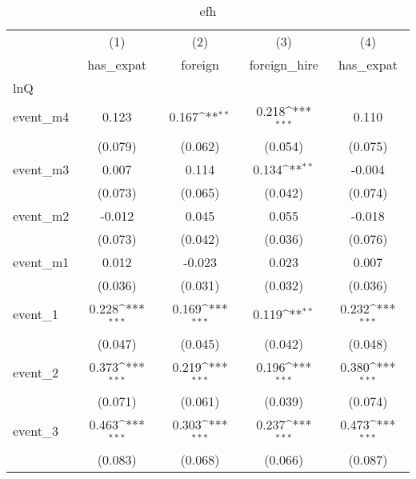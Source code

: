 \begin{table}[htbp]\centering
\def\sym#1{\ifmmode^{#1}\else\(^{#1}\)\fi}
\caption{efh}
\begin{tabular}{l*{4}{c}}
\hline\hline
            &\multicolumn{1}{c}{(1)}&\multicolumn{1}{c}{(2)}&\multicolumn{1}{c}{(3)}&\multicolumn{1}{c}{(4)}\\
            &\multicolumn{1}{c}{has\_expat}&\multicolumn{1}{c}{foreign}&\multicolumn{1}{c}{foreign\_hire}&\multicolumn{1}{c}{has\_expat}\\
\hline
lnQ         &                     &                     &                     &                     \\
event\_m4    &       0.123         &       0.167\sym{**} &       0.218\sym{***}&       0.110         \\
            &     (0.079)         &     (0.062)         &     (0.054)         &     (0.075)         \\
[1em]
event\_m3    &       0.007         &       0.114         &       0.134\sym{**} &      -0.004         \\
            &     (0.073)         &     (0.065)         &     (0.042)         &     (0.074)         \\
[1em]
event\_m2    &      -0.012         &       0.045         &       0.055         &      -0.018         \\
            &     (0.073)         &     (0.042)         &     (0.036)         &     (0.076)         \\
[1em]
event\_m1    &       0.012         &      -0.023         &       0.023         &       0.007         \\
            &     (0.036)         &     (0.031)         &     (0.032)         &     (0.036)         \\
[1em]
event\_1     &       0.228\sym{***}&       0.169\sym{***}&       0.119\sym{**} &       0.232\sym{***}\\
            &     (0.047)         &     (0.045)         &     (0.042)         &     (0.048)         \\
[1em]
event\_2     &       0.373\sym{***}&       0.219\sym{***}&       0.196\sym{***}&       0.380\sym{***}\\
            &     (0.071)         &     (0.061)         &     (0.039)         &     (0.074)         \\
[1em]
event\_3     &       0.463\sym{***}&       0.303\sym{***}&       0.237\sym{***}&       0.473\sym{***}\\
            &     (0.083)         &     (0.068)         &     (0.066)         &     (0.087)         \\

\end{tabular}
\end{table}

